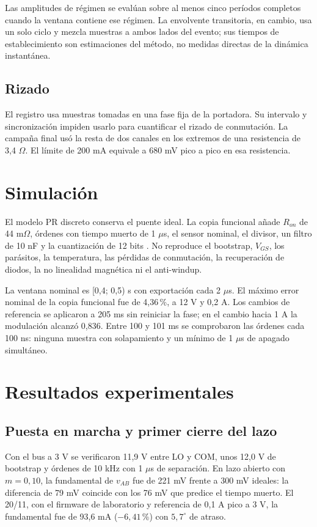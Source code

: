 \documentclass[conference]{IEEEtran}
\begin{document}
Las amplitudes de régimen se evalúan sobre al menos cinco períodos completos cuando la ventana contiene ese régimen. La envolvente transitoria, en cambio, usa un solo ciclo y mezcla muestras a ambos lados del evento; sus tiempos de establecimiento son estimaciones del método, no medidas directas de la dinámica instantánea.

\subsection{Rizado}
El registro usa muestras tomadas en una fase fija de la portadora. Su intervalo y sincronización impiden usarlo para cuantificar el rizado de conmutación. La campaña final usó la resta de dos canales en los extremos de una resistencia de 3,4 $\Omega$. El límite de 200 mA equivale a 680 mV pico a pico en esa resistencia.

\section{Simulación}
El modelo PR discreto conserva el puente ideal. La copia funcional añade $R_{on}$ de 44 m$\Omega$, órdenes con tiempo muerto de 1 $\mu$s, el sensor nominal, el divisor, un filtro de 10 nF y la cuantización de 12 bits \cite{irf,plecs}. No reproduce el bootstrap, $V_{GS}$, los parásitos, la temperatura, las pérdidas de conmutación, la recuperación de diodos, la no linealidad magnética ni el anti-windup.

La ventana nominal es [0,4; 0,5) s con exportación cada 2 $\mu$s. El máximo error nominal de la copia funcional fue de 4,36\,\%, a 12 V y 0,2 A. Los cambios de referencia se aplicaron a 205 ms sin reiniciar la fase; en el cambio hacia 1 A la modulación alcanzó 0,836. Entre 100 y 101 ms se comprobaron las órdenes cada 100 ns: ninguna muestra con solapamiento y un mínimo de 1 $\mu$s de apagado simultáneo.

\section{Resultados experimentales}
\subsection{Puesta en marcha y primer cierre del lazo}
Con el bus a 3 V se verificaron 11,9 V entre LO y COM, unos 12,0 V de bootstrap y órdenes de 10 kHz con 1 $\mu$s de separación. En lazo abierto con $m=0{,}10$, la fundamental de $v_{AB}$ fue de 221 mV frente a 300 mV ideales: la diferencia de 79 mV coincide con los 76 mV que predice el tiempo muerto. El 20/11, con el firmware de laboratorio y referencia de 0,1 A pico a 3 V, la fundamental fue de 93,6 mA ($-6{,}41$\,\%) con $5{,}7^\circ$ de atraso.
\end{document}
